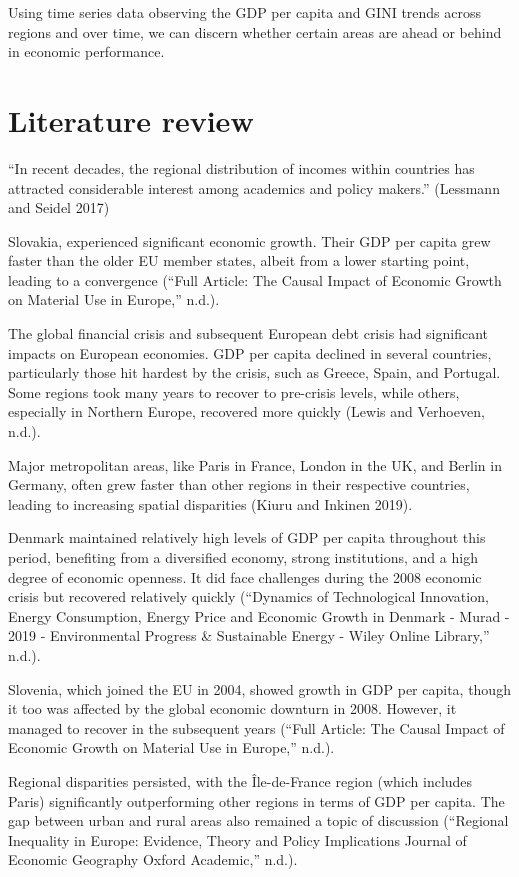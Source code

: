 \documentclass[
  a4paper,
  DIV=11,
  numbers=noendperiod]{scrartcl}
\begin{document}
Using time series data observing the GDP per capita and GINI trends
across regions and over time, we can discern whether certain areas are
ahead or behind in economic performance.

\hypertarget{literature-review}{%
\section{Literature review}\label{literature-review}}

``In recent decades, the regional distribution of incomes within
countries has attracted considerable interest among academics and policy
makers.'' (Lessmann and Seidel 2017)

Slovakia, experienced significant economic growth. Their GDP per capita
grew faster than the older EU member states, albeit from a lower
starting point, leading to a convergence ({``Full Article: The Causal
Impact of Economic Growth on Material Use in Europe,''} n.d.).

The global financial crisis and subsequent European debt crisis had
significant impacts on European economies. GDP per capita declined in
several countries, particularly those hit hardest by the crisis, such as
Greece, Spain, and Portugal. Some regions took many years to recover to
pre-crisis levels, while others, especially in Northern Europe,
recovered more quickly (Lewis and Verhoeven, n.d.).

Major metropolitan areas, like Paris in France, London in the UK, and
Berlin in Germany, often grew faster than other regions in their
respective countries, leading to increasing spatial disparities (Kiuru
and Inkinen 2019).

Denmark maintained relatively high levels of GDP per capita throughout
this period, benefiting from a diversified economy, strong institutions,
and a high degree of economic openness. It did face challenges during
the 2008 economic crisis but recovered relatively quickly ({``Dynamics
of Technological Innovation, Energy Consumption, Energy Price and
Economic Growth in Denmark - Murad - 2019 - Environmental Progress \&
Sustainable Energy - Wiley Online Library,''} n.d.).

Slovenia, which joined the EU in 2004, showed growth in GDP per capita,
though it too was affected by the global economic downturn in 2008.
However, it managed to recover in the subsequent years ({``Full Article:
The Causal Impact of Economic Growth on Material Use in Europe,''}
n.d.).

Regional disparities persisted, with the Île-de-France region (which
includes Paris) significantly outperforming other regions in terms of
GDP per capita. The gap between urban and rural areas also remained a
topic of discussion ({``Regional Inequality in Europe: Evidence, Theory
and Policy Implications \textbar{} Journal of Economic Geography
\textbar{} Oxford Academic,''} n.d.).
\end{document}
